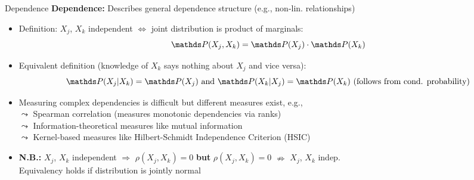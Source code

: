 \documentclass[11pt,compress,t,notes=noshow, aspectratio=169, xcolor=table]{beamer}
\begin{document}
\begin{frame}{Dependence}
\textbf{Dependence:} Describes general dependence structure  (e.g., non-lin. relationships)

\begin{itemize}[<+->]
\item Definition: $X_j$, $X_k$ independent $\Leftrightarrow$ joint distribution is product of marginals:%
$$\P(X_j, X_k) = \P(X_j) \cdot \P(X_k)$$
\item Equivalent definition (knowledge of $X_k$ says nothing about $X_j$ and vice versa): 
$$\P(X_j|X_k) = \P(X_j) \text{ and } \P(X_k|X_j) = \P(X_k) \text{ (follows from cond. probability)}$$ 
\item Measuring complex dependencies is difficult but different measures exist, e.g., \\
$\leadsto$ Spearman correlation (measures monotonic dependencies via ranks) \\
$\leadsto$ Information-theoretical measures like mutual information \\
$\leadsto$ Kernel-based measures like Hilbert-Schmidt Independence Criterion (HSIC)
\item \textbf{N.B.:} $X_j$, $X_k$ independent $\Rightarrow$ $\rho(X_j, X_k) = 0$ \textbf{but} $\rho(X_j, X_k) = 0$ $\nRightarrow$ $X_j$, $X_k$  indep. \\
Equivalency holds if distribution is jointly normal
\end{itemize}
\end{frame}
\end{document}
